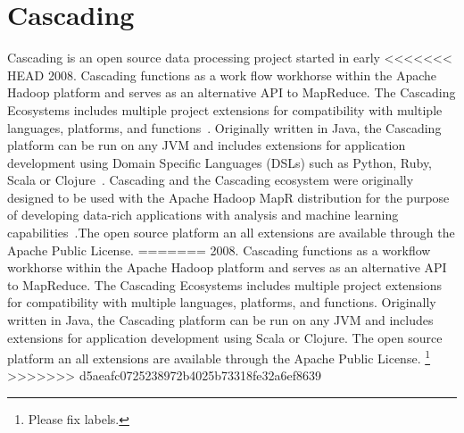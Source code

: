 \section{Cascading}

Cascading is an open source data processing project started in early
<<<<<<< HEAD
2008. Cascading functions as a work flow workhorse within the Apache
Hadoop platform and serves as an alternative API to MapReduce. The
Cascading Ecosystems includes multiple project extensions for
compatibility with multiple languages, platforms, and
functions~\cite{hid-sp18-507-CascadingEco}. Originally written in
Java, the Cascading platform can be run on any JVM and includes
extensions for application development using Domain Specific Languages
(DSLs) such as Python, Ruby, Scala or
Clojure~\cite{hid-sp18-507-GitHubCascading}. Cascading and the
Cascading ecosystem were originally designed to be used with the
Apache Hadoop MapR distribution for the purpose of developing
data-rich applications with analysis and machine learning
capabilities~\cite{hid-sp18-507-MapR}.The open source platform an all
extensions are available through the Apache Public License.
=======
2008. Cascading functions as a workflow workhorse within the Apache Hadoop
platform and serves as an alternative API to MapReduce. The Cascading Ecosystems
includes multiple project extensions for compatibility with multiple languages,
platforms, and functions\cite{CascadingEco}. Originally written in Java, the
Cascading platform can be run on any JVM and includes extensions for application
development using Scala or Clojure. The open source platform an all extensions
are available through the Apache Public
License\cite{GitHubCascading}. \footnote{Please fix labels.}
>>>>>>> d5aeafc0725238972b4025b73318fe32a6ef8639
